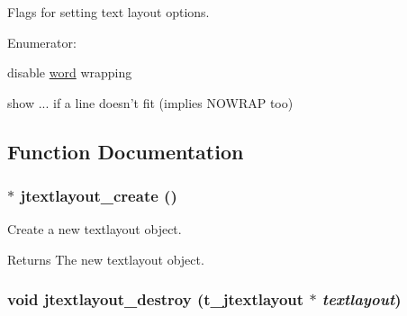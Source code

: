 Flags for setting text layout options. \begin{Desc}
\item[Enumerator: ]\par
\begin{description}
\item[{\em 
\hypertarget{group__textlayout_gga9b00aebce7fb7877e7e4c13e18b38f08a2e017ab0c3bba7f02373f6621bee41e8}{
JGRAPHICS\_\-TEXTLAYOUT\_\-NOWRAP}
\label{group__textlayout_gga9b00aebce7fb7877e7e4c13e18b38f08a2e017ab0c3bba7f02373f6621bee41e8}
}]disable \hyperlink{unionword}{word} wrapping \item[{\em 
\hypertarget{group__textlayout_gga9b00aebce7fb7877e7e4c13e18b38f08a0c76c7621cdb18e19d7ef767e8b71fe5}{
JGRAPHICS\_\-TEXTLAYOUT\_\-USEELLIPSIS}
\label{group__textlayout_gga9b00aebce7fb7877e7e4c13e18b38f08a0c76c7621cdb18e19d7ef767e8b71fe5}
}]show ... if a line doesn't fit (implies NOWRAP too) \end{description}
\end{Desc}



\subsection{Function Documentation}
\hypertarget{group__textlayout_gaf615694d8a34728f84092838b91e2a4a}{
\subsubsection[{jtextlayout\_\-create}]{$\ast$ jtextlayout\_\-create ()}}
\label{group__textlayout_gaf615694d8a34728f84092838b91e2a4a}


Create a new textlayout object. \begin{DoxyReturn}{Returns}
The new textlayout object. 
\end{DoxyReturn}
\hypertarget{group__textlayout_ga3bd3ba8982b5b42bcf8870515b708303}{
\subsubsection[{jtextlayout\_\-destroy}]{\setlength{\rightskip}{0pt plus 5cm}void jtextlayout\_\-destroy ({\bf t\_\-jtextlayout} $\ast$ {\em textlayout})}}
\label{group__textlayout_ga3bd3ba8982b5b42bcf8870515b708303}



